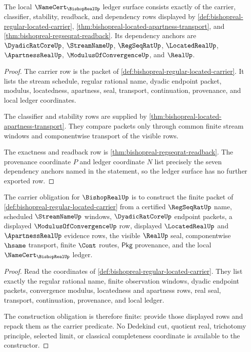 \begin{theorem}
\label{thm:bishopreal-ledger-obligation-surface}
The local $\NameCert_{\BishopRealUp}$ ledger surface consists exactly of the
carrier, classifier, stability, readback, and dependency rows displayed by
\autoref{def:bishopreal-regular-located-carrier},
\autoref{thm:bishopreal-located-apartness-transport}, and
\autoref{thm:bishopreal-regseqrat-readback}. Its dependency anchors are
$\DyadicRatCoreUp$, $\StreamNameUp$, $\RegSeqRatUp$, $\LocatedRealUp$,
$\ApartnessRealUp$, $\ModulusOfConvergenceUp$, and $\RealUp$.
\end{theorem}
\begin{proof}
The carrier row is the packet of
\autoref{def:bishopreal-regular-located-carrier}. It lists the stream schedule,
regular rational name, dyadic endpoint packet, modulus, locatedness, apartness,
seal, transport, continuation, provenance, and local ledger coordinates.

The classifier and stability rows are supplied by
\autoref{thm:bishopreal-located-apartness-transport}. They compare packets only
through common finite stream windows and componentwise transport of the visible
rows.

The exactness and readback row is
\autoref{thm:bishopreal-regseqrat-readback}. The provenance coordinate $P$ and
ledger coordinate $N$ list precisely the seven dependency anchors named in the
statement, so the ledger surface has no further exported row.
\end{proof}

\begin{theorem}
\label{thm:bishopreal-carrier-construction-obligation}
The carrier obligation for $\BishopRealUp$ is to construct the finite packet
of \autoref{def:bishopreal-regular-located-carrier} from a certified
$\RegSeqRatUp$ name, scheduled $\StreamNameUp$ windows, $\DyadicRatCoreUp$
endpoint packets, a displayed $\ModulusOfConvergenceUp$ row, displayed
$\LocatedRealUp$ and $\ApartnessRealUp$ evidence rows, the visible $\RealUp$
seal, componentwise $\hsame$ transport, finite $\Cont$ routes, $\mathsf{Pkg}$
provenance, and the local $\NameCert_{\BishopRealUp}$ ledger.
\end{theorem}
\begin{proof}
Read the coordinates of \autoref{def:bishopreal-regular-located-carrier}.
They list exactly the regular rational name, finite observation windows,
dyadic endpoint packets, convergence modulus, locatedness and apartness rows,
real seal, transport, continuation, provenance, and local ledger.

The construction obligation is therefore finite: provide those displayed rows
and repack them as the carrier predicate. No Dedekind cut, quotient real,
trichotomy principle, selected limit, or classical completeness coordinate is
available to the constructor.
\end{proof}

